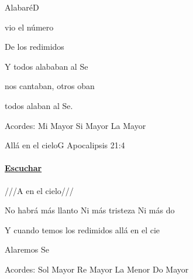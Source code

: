 \documentclass[12pt, spanish]{book}
\newcommand{\NotCCLIed}{\relax}
\begin{document}
\begin{song}{Alabaré}{D}
\begin{SBExtraKeys}
{            \begin{SBOpGroup}
                 vio el número

                De los redimidos

                Y todos alababan al Se

                nos cantaban, otros oban

                 todos alaban al Se.
            \end{SBOpGroup}

            \ifChordBk
            \begin{SBOpGroup}
                Acordes:\break
                \upchord{\E}\qquad Mi Mayor \hfill
                \upchord{\B}\qquad Si Mayor \hfill\null\break
                \upchord{\A}\qquad La Mayor \hfill\null\break
            \end{SBOpGroup}
            \fi
        }\end{SBExtraKeys}
    \end{song}

    \begin{song}{Allá en el cielo}{G}
        {} %
        {}
        {Apocalipsis 21:4} %
        {} %
        \ifChordBk
        \paragraph{\mbox{}\hfill\protect\href{https://open.spotify.com/intl-es/track/5W1WHWNKQzPYZXit9tR5Pg}{Escuchar}\mbox{}\hfill}
        \fi


        \begin{SBOpGroup}
            ///A en el cielo///

            No habrá más llanto Ni más tristeza Ni más do

            Y cuando temos los redimidos allá en el cie

            Alaremos  Se
        \end{SBOpGroup}

        \ifChordBk
        \begin{SBOpGroup}
            Acordes:\break
            \upchord{\G}\qquad Sol Mayor \hfill
            \upchord{\D}\qquad Re Mayor \hfill\null\break
            \upchord{\Am}\qquad La Menor \hfill
            \upchord{\C}\qquad Do Mayor \hfill\null\break
        \end{SBOpGroup}
        \fi
    \end{song}
\end{document}
